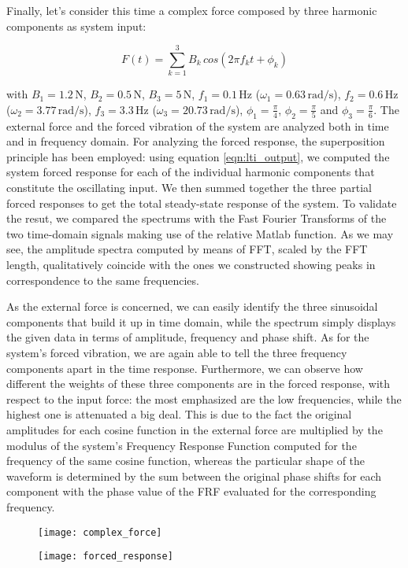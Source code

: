 \documentclass[a4paper,12pt,oneside]{article}
\begin{document}
Finally, let's consider this time a complex force composed by three harmonic components as system input:

\[ F(t) = \sum_{k=1}^3 B_k \, cos(2 \pi f_k t + \phi_k) \]

with $ B_1 = 1.2 \, \text{N} $, $ B_2 = 0.5 \, \text{N} $, $ B_3 = 5 \, \text{N} $, $ f_1 = 0.1 \, \text{Hz} $ ($ \omega_1 = 0.63 \, \text{rad/s} $), $ f_2 = 0.6 \, \text{Hz} $ ($ \omega_2 = 3.77 \, \text{rad/s} $), $ f_3 = 3.3 \, \text{Hz} $ ($ \omega_3 = 20.73 \, \text{rad/s} $), $ \phi_1 = \frac{\pi}{4} $, $ \phi_2 = \frac{\pi}{5} $ and $ \phi_3 = \frac{\pi}{6} $. The external force and the forced vibration of the system are analyzed both in time and in frequency domain. For analyzing the forced response, the superposition principle has been employed: using equation \eqref{eqn:lti_output}, we computed the system forced response for each of the individual harmonic components that constitute the oscillating input. We then summed together the three partial forced responses to get the total steady-state response of the system. To validate the resut, we compared the spectrums with the Fast Fourier Transforms of the two time-domain signals making use of the relative Matlab function. As we may see, the amplitude spectra computed by means of FFT, scaled by the FFT length, qualitatively coincide with the ones we constructed showing peaks in correspondence to the same frequencies.

As the external force is concerned, we can easily identify the three sinusoidal components that build it up in time domain, while the spectrum simply displays the given data in terms of amplitude, frequency and phase shift. As for the system's forced vibration, we are again able to tell the three frequency components apart in the time response. Furthermore, we can observe how different the weights of these three components are in the forced response, with respect to the input force: the most emphasized are the low frequencies, while the highest one is attenuated a big deal. This is due to the fact the original amplitudes for each cosine function in the external force are multiplied by the modulus of the system's Frequency Response Function computed for the frequency of the same cosine function, whereas the particular shape of the waveform is determined by the sum between the original phase shifts for each component with the phase value of the FRF evaluated for the corresponding frequency.

\begin{figure}
	\centering
	\texttt{[image: complex\_force]}
\end{figure}

\begin{figure}
	\centering
	\texttt{[image: forced\_response]}
\end{figure}
\end{document}
